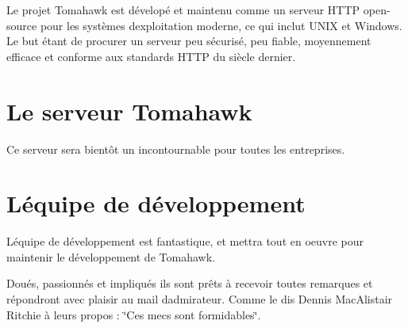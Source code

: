 Le projet Tomahawk est dévelopé et maintenu comme un serveur H\+T\+TP open-\/source pour les systèmes d\textquotesingle{}exploitation moderne, ce qui inclut U\+N\+IX et Windows. Le but étant de procurer un serveur peu sécurisé, peu fiable, moyennement efficace et conforme aux standards H\+T\+TP du siècle dernier.

\section*{Le serveur Tomahawk}

Ce serveur sera bientôt un incontournable pour toutes les entreprises.

\section*{L\textquotesingle{}équipe de développement}

L\textquotesingle{}équipe de développement est fantastique, et mettra tout en oeuvre pour maintenir le développement de Tomahawk. 

Doués, passionnés et impliqués ils sont prêts à recevoir toutes remarques et répondront avec plaisir au mail d\textquotesingle{}admirateur. Comme le dis Dennis Mac\+Alistair Ritchie à leurs propos \+: \char`\"{}\+Ces mecs sont formidables\char`\"{}.